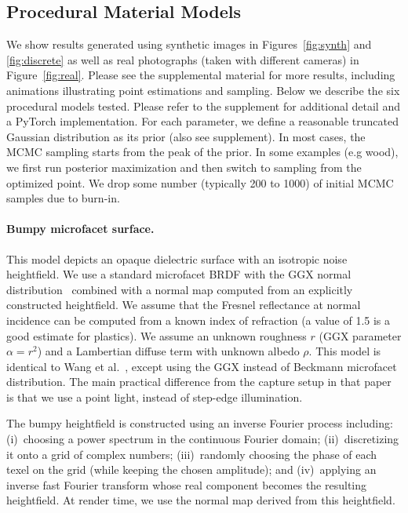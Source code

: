 



\subsection{Procedural Material  Models}
\label{ssec:proc_models}
%
We show results generated using synthetic images in Figures~\ref{fig:synth} and \ref{fig:discrete} as well as real photographs (taken with different cameras) in Figure~\ref{fig:real}.
Please see the supplemental material for more results, including animations illustrating point estimations and sampling. Below we describe the six procedural models tested. Please refer to the supplement for additional detail and a PyTorch implementation. For each parameter, we define a reasonable truncated Gaussian distribution as its prior (also see supplement). In most cases, the MCMC sampling starts from the peak of the prior. In some examples (e.g wood), we first run posterior maximization and then switch to sampling from the optimized point. We drop some number (typically 200 to 1000) of initial MCMC samples due to burn-in.

\paragraph*{Bumpy microfacet surface.}
This model depicts an opaque dielectric surface with an isotropic noise heightfield. We use a standard microfacet BRDF with the GGX normal distribution~\cite{Walter2007} combined with a normal map computed from an explicitly constructed heightfield. We assume that the Fresnel reflectance at normal incidence can be computed from a known index of refraction (a value of 1.5 is a good estimate for plastics). We assume an unknown roughness $r$ (GGX parameter $\alpha=r^2$) and a Lambertian diffuse term with unknown albedo $\rho$. This model is identical to Wang et al.~\cite{Wang2011}, except using the GGX instead of Beckmann microfacet distribution. The main practical difference from the capture setup in that paper is that we use a point light, instead of step-edge illumination.

The bumpy heightfield is constructed using an inverse Fourier process including: (i)~choosing a power spectrum in the continuous Fourier domain; (ii)~discretizing it onto a grid of complex numbers; (iii)~randomly choosing the phase of each texel on the grid (while keeping the chosen amplitude); and (iv)~applying an inverse fast Fourier transform whose
real component becomes the resulting heightfield.
At render time, we use the normal map derived from this heightfield.

